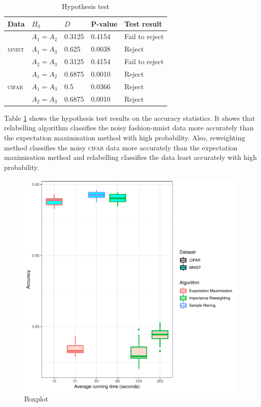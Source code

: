 \documentclass[12pt]{article} %
\begin{document}
\begin{table}[tbh]
\centering
 	\caption{Hypothesis test}   
	\begin{tabular}{lllll}
\toprule
Data & $H_0$ & $D$ & P-value & Test result\\
\midrule
 & $A_1= A_2$  &0.3125 & 0.4154 & Fail to reject\\
 
 \textsc{mnist} & $A_1= A_3$ & 0.625 & 0.0038 & Reject\\
 
  & $A_2= A_3$ & 0.3125 & 0.4154 & Fail to reject\\
\midrule
   & $A_1= A_2$ & 0.6875 & 0.0010 & Reject\\

 \textsc{cifar}  & $A_1= A_3$ & 0.5 & 0.0366 & Reject\\

  &  $A_2=A_3$  & 0.6875 & 0.0010 & Reject\\
\bottomrule
\end{tabular} 

	\label{tab:HypothesisTest}
\end{table}

Table \ref{tab:HypothesisTest} shows the hypothesis test results on the accuracy statistics. 
It shows that relabelling algorithm classifies the noisy fashion-mnist data more accurately than the expectation maximisation method with high probability.
Also, reweighting method classifies the noisy \textsc{cifar} data more accurately than the expectation maximisation method and relabelling classifies the data least accurately with high probability. 

\begin{figure}[tbh]
    
	\centering
    \includegraphics[scale=0.7]{boxplotll}%
	\caption{Boxplot}
	\label{fig:Boxplot}
\end{figure}
\end{document}
